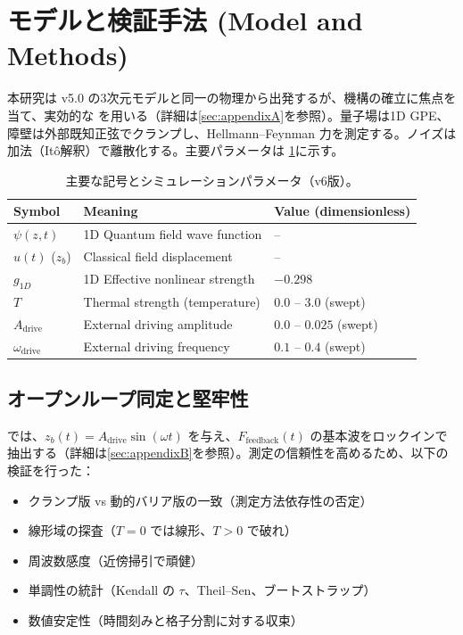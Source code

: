 \documentclass[a4paper,11pt,ja=standard,lualatex]{bxjsarticle}
\newcommand{\tabref}[1]{\cref{#1}}
\newcommand{\secref}[1]{\cref{#1}}
\begin{document}
\section{モデルと検証手法 (Model and Methods)}
本研究は v5.0 の3次元モデルと同一の物理から出発するが、機構の確立に焦点を当て、実効的な  を用いる（詳細は\secref{sec:appendixA}を参照）。量子場は1D GPE、障壁は外部既知正弦でクランプし、Hellmann--Feynman 力を測定する。ノイズは加法（Itô解釈）で離散化する\cite{Bradley2008}。主要パラメータは \tabref{tab:params_v6}に示す。

\begin{table}[H]
\centering
\caption{主要な記号とシミュレーションパラメータ（v6版）。}
\label{tab:params_v6}
\begin{tabular}{l l l}
\hline
\textbf{Symbol} & \textbf{Meaning} & \textbf{Value (dimensionless)} \\
\hline
$\psi(z,t)$ & 1D Quantum field wave function & -- \\
$u(t)$ ($z_b$) & Classical field displacement & -- \\
$g_{1D}$ & 1D Effective nonlinear strength & $-0.298$ \\
$T$ & Thermal strength (temperature) & $0.0\text{ -- }3.0$ (swept) \\
$A_{\mathrm{drive}}$ & External driving amplitude & $0.0\text{ -- }0.025$ (swept) \\
$\omega_{\mathrm{drive}}$ & External driving frequency & $0.1\text{ -- }0.4$ (swept) \\
\hline
\end{tabular}
\end{table}

\subsection{オープンループ同定と堅牢性}
では、$z_b(t)=A_{\mathrm{drive}}\sin(\omega t)$ を与え、$F_{\mathrm{feedback}}(t)$ の基本波をロックインで抽出する（詳細は\secref{sec:appendixB}を参照）。測定の信頼性を高めるため、以下の検証を行った：
\begin{itemize}
  \item クランプ版 vs 動的バリア版の一致（測定方法依存性の否定）
  \item 線形域の探査（$T=0$ では線形、$T>0$ で破れ）
  \item 周波数感度（近傍掃引で頑健）
  \item 単調性の統計（Kendall の $\tau$、Theil--Sen、ブートストラップ\cite{Kendall1938,Sen1968,Efron1979}）
  \item 数値安定性（時間刻みと格子分割に対する収束）
\end{itemize}
\end{document}
